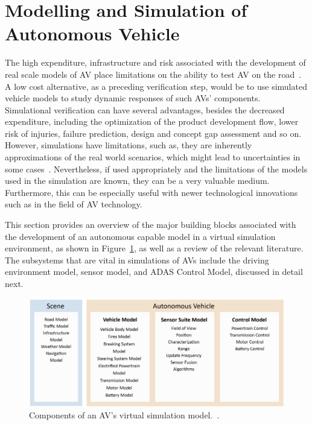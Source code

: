 \documentclass{article}
\begin{document}
\section{Modelling and Simulation of Autonomous Vehicle}

The high expenditure, infrastructure and risk associated with the development of real scale models of AV place limitations on the ability to test AV on the road~\cite{Araujo2016}. A low cost alternative, as a preceding verification step, would be to use  simulated vehicle models to study dynamic responses of such AVs’ components. Simulational verification can have several advantages, besides the decreased expenditure, including the optimization of the product development flow, lower risk of injuries, failure prediction, design and concept gap assessment and so on. However, simulations have limitations, such as, they are inherently approximations of the real world scenarios, which might lead to uncertainties in some cases~\cite{Traub2016}. Nevertheless, if used appropriately and the limitations of the models used in the simulation are known, they can be a very valuable medium. Furthermore, this can be especially useful with newer technological innovations such as in the field of AV technology. 

This section provides an overview of the major building blocks associated with the development of an autonomous capable model in a virtual simulation environment, as shown in Figure~\ref{fig:avmodelling}, as well as a review of the relevant literature. The subsystems that are vital in simulations of AVs include the driving environment model, sensor model, and ADAS Control Model, discussed in detail next.

\begin{figure}[htbp]
\begin{center}
\includegraphics[scale=0.5]{figures/avmodel.png}
\caption{Components of an AV's virtual simulation model.~\cite{Hamilton2018}.}
\label{fig:avmodelling}
\end{center}
\end{figure}
\end{document}

